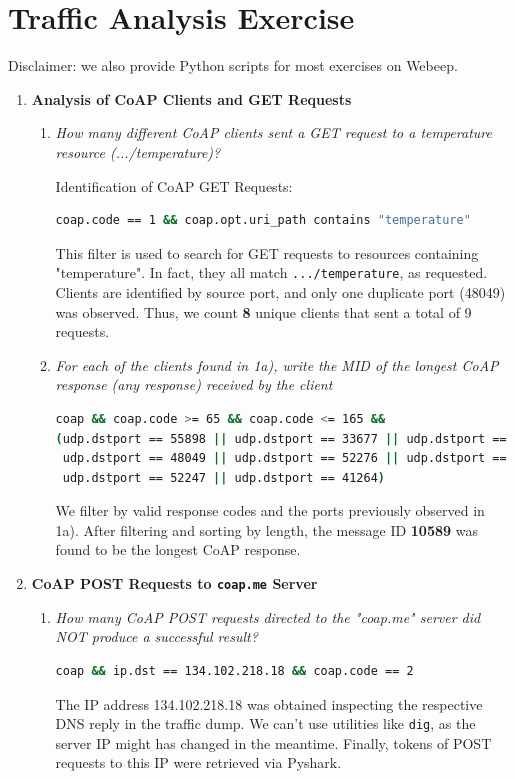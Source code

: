 \documentclass{article}
\begin{document}
\section{Traffic Analysis Exercise}
Disclaimer: we also provide Python scripts for most exercises on Webeep.
\begin{enumerate}
    \item \textbf{Analysis of CoAP Clients and GET Requests}
    \begin{enumerate}
        \item \textit{How many different CoAP clients sent a GET request to a
temperature resource (.../temperature)?} 
        
        Identification of CoAP GET Requests:
        \begin{lstlisting}[language=bash]
coap.code == 1 && coap.opt.uri_path contains "temperature"
        \end{lstlisting}
        This filter is used to search for GET requests to resources containing "temperature". In fact, they all match \verb|.../temperature|, as requested. Clients are identified by source port, and only one duplicate port (48049) was observed. Thus, we count \textbf{8} unique clients that sent a total of 9 requests.

        \item 
        \textit{For each of the clients found in 1a), write the MID of the longest
CoAP response (any response) received by the client}

        \begin{lstlisting}[language=bash]
coap && coap.code >= 65 && coap.code <= 165 &&
(udp.dstport == 55898 || udp.dstport == 33677 || udp.dstport == 51812 || 
 udp.dstport == 48049 || udp.dstport == 52276 || udp.dstport == 48645 || 
 udp.dstport == 52247 || udp.dstport == 41264)
        \end{lstlisting}
        We filter by valid response codes and the ports previously observed in 1a).
        After filtering and sorting by length, the message ID \textbf{10589} was found to be the longest CoAP response.
    \end{enumerate}
    \item \textbf{CoAP POST Requests to \texttt{coap.me} Server}
    \begin{enumerate}
        \item 
        \textit{How many CoAP POST requests directed to the "coap.me" server
did NOT produce a successful result?}
        \begin{lstlisting}[language=bash]
coap && ip.dst == 134.102.218.18 && coap.code == 2
        \end{lstlisting}
        The IP address 134.102.218.18 was obtained inspecting the respective DNS reply in the traffic dump.
        We can't use utilities like \texttt{dig}, as the server IP might has changed in the meantime.
        Finally, tokens of POST requests to this IP were retrieved via Pyshark.
        

\end{enumerate}
\end{enumerate}
\end{document}
